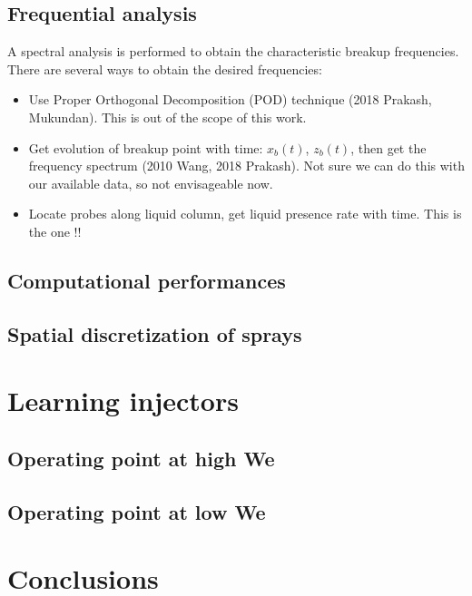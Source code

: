 \subsection{Frequential analysis}

A spectral analysis is performed to obtain the characteristic breakup frequencies. There are several ways to obtain the desired frequencies:

\begin{itemize}

	\item Use Proper Orthogonal Decomposition (POD) technique (2018 Prakash, Mukundan). This is out of the scope of this work.
	
	\item Get evolution of breakup point with time: $x_b \left( t \right)$, $z_b \left( t \right)$, then get the frequency spectrum  (2010 Wang, 2018 Prakash). Not sure we can do this with our available data, so not envisageable now.
	
	\item Locate probes along liquid column, get liquid presence rate with time. This is the one !!

\end{itemize}

\subsection{Computational performances}
\label{subsubsec:ch5_computational_performances}


\subsection{Spatial discretization of sprays}

\section{Learning injectors}

\subsection{Operating point at high We}

\subsection{Operating point at low We}


\section{Conclusions}

